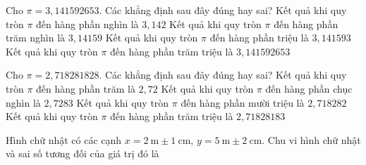 


\begin{ex}%
	 Cho $\pi = 3{,} 141 592 653$.
	Các khẳng  định sau đây đúng hay sai?
	\choiceTF 
		{\True Kết quả khi quy  tròn $\pi$ đến hàng phần nghìn là $3{,} 142$}
		{\True Kết quả khi quy tròn $\pi$ đến hàng phần trăm nghìn  là $3{,} 14159$}
		{\True Kết quả khi quy tròn $\pi$ đến hàng phần triệu  là $3{,} 141593$}
		{Kết quả khi quy tròn $\pi$ đến hàng phần trăm triệu là  $3{,} 141592653$}
\end{ex}

\begin{ex}%
	Cho $\pi = 2{,}718  281 828$.
	Các khẳng  định sau đây đúng hay sai?
	 \choiceTF
		{\True Kết quả khi  quy tròn $\pi$ đến hàng phần trăm là $2{,} 72$}
		{\True Kết quả  khi quy tròn $\pi$ đến hàng phần chục nghìn là $2{,} 7283$}
		{Kết quả  khi quy tròn $\pi$ đến hàng phần mười triệu là $2{,}718 282$}
		{\True Kết quả khi quy tròn $\pi$ đến hàng phần trăm triệu là $2{,}718 281 83$} 
\end{ex}


\begin{bt}%
	Hình chữ  nhật có các cạnh $x=2 \mathrm{~m} \pm 1 \mathrm{~cm}$, $y=5 \mathrm{~m} \pm 2 \mathrm{~cm}$. Chu vi hình chữ nhật và sai số tương đối của giá trị đó là
\end{bt}

